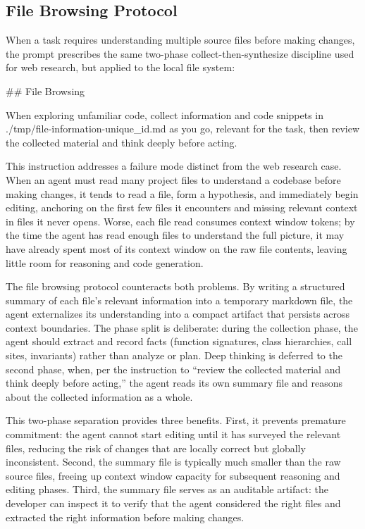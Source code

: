 \documentclass{article}
\begin{document}
\subsection{File Browsing Protocol}

When a task requires understanding multiple source files before making changes, the prompt prescribes the same two-phase collect-then-synthesize discipline used for web research, but applied to the local file system:

\begin{prompt}
## File Browsing

When exploring unfamiliar code, collect information and
code snippets in ./tmp/file-information-{unique_id}.md
as you go, relevant for the task, then review the
collected material and think deeply before acting.
\end{prompt}

\noindent This instruction addresses a failure mode distinct from the web research case.  When an agent must read many project files to understand a codebase before making changes, it tends to read a file, form a hypothesis, and immediately begin editing, anchoring on the first few files it encounters and missing relevant context in files it never opens.  Worse, each file read consumes context window tokens; by the time the agent has read enough files to understand the full picture, it may have already spent most of its context window on the raw file contents, leaving little room for reasoning and code generation.

The file browsing protocol counteracts both problems.  By writing a structured summary of each file's relevant information into a temporary markdown file, the agent externalizes its understanding into a compact artifact that persists across context boundaries.  The phase split is deliberate: during the collection phase, the agent should extract and record facts (function signatures, class hierarchies, call sites, invariants) rather than analyze or plan.  Deep thinking is deferred to the second phase, when, per the instruction to ``review the collected material and think deeply before acting,'' the agent reads its own summary file and reasons about the collected information as a whole.

This two-phase separation provides three benefits.  First, it prevents premature commitment: the agent cannot start editing until it has surveyed the relevant files, reducing the risk of changes that are locally correct but globally inconsistent.  Second, the summary file is typically much smaller than the raw source files, freeing up context window capacity for subsequent reasoning and editing phases.  Third, the summary file serves as an auditable artifact: the developer can inspect it to verify that the agent considered the right files and extracted the right information before making changes.
\end{document}
